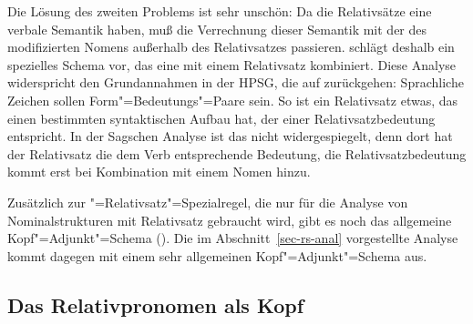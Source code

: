 
Die Lösung des zweiten Problems ist sehr unschön: Da die Relativsätze eine verbale Semantik haben,
muß die Verrechnung dieser Semantik mit der des modifizierten Nomens außerhalb des Relativsatzes
passieren. \citet[]{Sag97a} schlägt deshalb ein spezielles Schema vor, das eine \nbar mit
einem Relativsatz kombiniert. Diese Analyse widerspricht den Grundannahmen in der HPSG, die auf
\citet{Saussure16a-de} zurückgehen: Sprachliche Zeichen sollen Form"=Bedeutungs"=Paare sein. So ist ein
Relativsatz etwas, das einen bestimmten syntaktischen Aufbau hat, der einer Relativsatzbedeutung
entspricht. In der Sagschen Analyse ist das nicht widergespiegelt, denn dort hat der Relativsatz die
dem Verb entsprechende Bedeutung, die Relativsatzbedeutung kommt erst bei Kombination mit einem
Nomen hinzu.

Zusätzlich zur \nbar"=Relativsatz"=Spezialregel, die nur für die Analyse von
Nominalstrukturen mit Relativsatz gebraucht wird, gibt es noch das allgemeine
Kopf"=Adjunkt"=Schema (). Die im Abschnitt~\ref{sec-rs-anal} vorgestellte
Analyse kommt dagegen mit einem sehr allgemeinen Kopf"=Adjunkt"=Schema aus.





\subsection{Das Relativpronomen als Kopf}


